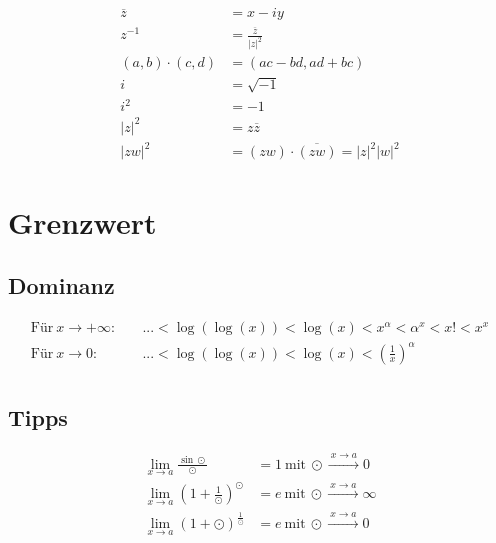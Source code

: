 \documentclass[11pt]{article}
\begin{document}
\begin{equation*}
\begin{split}
	\overline{z} & = x - iy\\
	z^{-1} & = \frac{\overline{z}}{|z|^2} \\
	(a,b) \cdot (c, d) & = (ac-bd, ad+bc) \\
	i & = \sqrt{-1}\\
	i^2 & = -1 \\
	|z|^2 & = z\overline{z} \\
	|zw|^2 & = (zw) \cdot \overline{(zw)} = |z|^2|w|^2
\end{split}
\end{equation*}

\section{Grenzwert}

\subsection{Dominanz}

\begin{equation*}
\begin{split}
	\text{F{\"u}r}\ x \to +\infty:\quad & ... < \log(\log(x)) < \log(x) < x^\alpha < \alpha^x < x! < x^x \\
	\text{F{\"u}r}\ x \to 0:\quad & ... < \log(\log(x)) < \log(x) < (\frac{1}{x})^\alpha \\
\end{split}
\end{equation*}

\subsection{Tipps}

\begin{equation*}
\begin{split}
	\lim_{x \to a} \frac{\sin \odot}{\odot} & = 1\ \text{mit}\ \odot \xrightarrow{\: x \to a \: } 0 \\ 
	\lim_{x \to a} (1 + \frac{1}{\odot})^\odot & = e\ \text{mit}\ \odot \xrightarrow{\: x \to a \: } \infty \\ 
	\lim_{x \to a} (1 + \odot)^\frac{1}{\odot} & = e\ \text{mit}\ \odot \xrightarrow{\: x \to a \: } 0 \\ 
\end{split}
\end{equation*}
\end{document}
